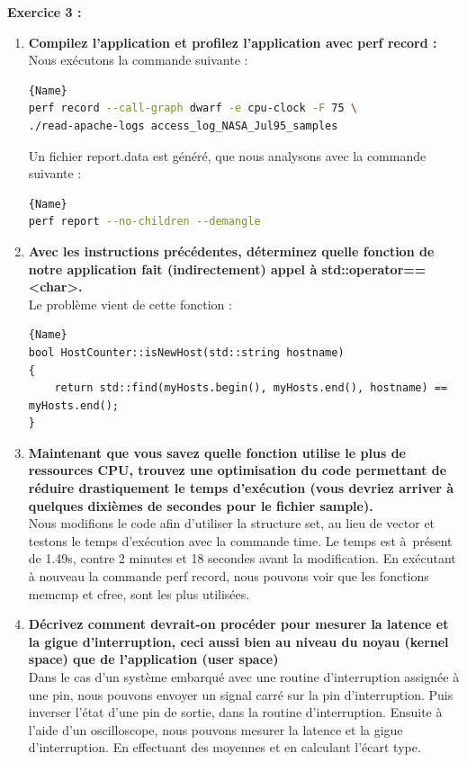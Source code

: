 \documentclass[
	a4paper, %
	10pt, %
]{CSUniSchoolLabReport}
\begin{document}

\textbf{Exercice 3 :}
\begin{enumerate}[label=\textbf{\arabic*}]

\item \textbf{Compilez l’application et profilez l’application avec perf record :}\\
Nous ex\'ecutons la commande suivante :
\begin{lstlisting}[language=bash, firstnumber=1]{Name}
perf record --call-graph dwarf -e cpu-clock -F 75 \
./read-apache-logs access_log_NASA_Jul95_samples
\end{lstlisting}

Un fichier report.data est généré, que nous analysons avec la commande suivante :
\begin{lstlisting}[language=bash, firstnumber=1]{Name}
perf report --no-children --demangle
\end{lstlisting}
\item \textbf{Avec les instructions précédentes, déterminez quelle fonction de notre application fait (indirectement) appel à std::operator==<char>.}\\

Le probl\`eme vient de cette fonction :
\begin{lstlisting}[style=CStyle, caption=Extrait de hostcounter.cpp, firstnumber=1]{Name}
bool HostCounter::isNewHost(std::string hostname)
{
    return std::find(myHosts.begin(), myHosts.end(), hostname) == myHosts.end();
}
\end{lstlisting}

\item \textbf{Maintenant que vous savez quelle fonction utilise le plus de ressources CPU, trouvez une optimisation du code permettant de réduire drastiquement le temps d’exécution (vous devriez arriver à quelques dixièmes de secondes pour le fichier sample).}\\
Nous modifions le code afin d'utiliser la structure set, au lieu de vector et testons le temps d'ex\'ecution avec la commande time.
Le temps est \`a\ pr\'esent de 1.49s, contre 2 minutes et 18 secondes avant la modification.
En ex\'ecutant \`a nouveau la commande perf record, nous pouvons voir que les fonctions memcmp et cfree, sont les plus utilisées.

\item \textbf{Décrivez comment devrait-on procéder pour mesurer la latence et la gigue d’interruption, ceci aussi bien au niveau du noyau (kernel space) que de l’application (user space)}\\
Dans le cas d'un syst\`eme embarqué avec une routine d'interruption assignée \`a une pin, nous pouvons envoyer un signal carré sur la pin d'interruption.
Puis inverser l'\'etat d'une pin de sortie, dans la routine d'interruption.
Ensuite \`a l'aide d'un oscilloscope, nous pouvons mesurer la latence et la gigue d'interruption. En effectuant des moyennes et en calculant l'\'ecart type.\\
\end{enumerate}
\end{document}
